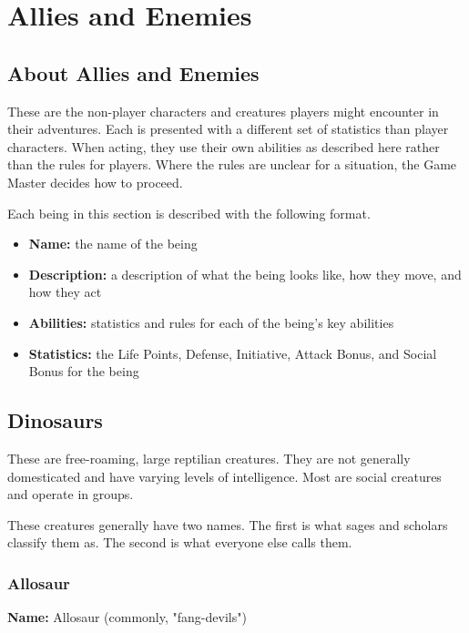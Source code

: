 \chapter{Allies and Enemies}

\begin{multicols}{2}

\section{About Allies and Enemies}

These are the non-player characters and creatures players might encounter in
their adventures. Each is presented with a different set of
statistics than player characters. When acting, they use their
own abilities as described here rather than the rules for players.
Where the rules are unclear for a situation, the Game Master decides
how to proceed.

Each being in this section is described with the following format.

\begin{itemize}
  \item \textbf{Name:} the name of the being
  \item \textbf{Description:} a description of what the being looks like, how they move, and how they act
  \item \textbf{Abilities:} statistics and rules for each of the being's key abilities
  \item \textbf{Statistics:} the Life Points, Defense, Initiative, Attack Bonus, and Social Bonus for the being
\end{itemize}

\section{Dinosaurs}

These are free-roaming, large reptilian creatures. They
are not generally domesticated and have varying levels
of intelligence. Most are social creatures and operate in
groups.

These creatures generally have two names. The first is
what sages and scholars classify them as. The second is
what everyone else calls them.

\subsection{Allosaur}

\textbf{Name:} Allosaur (commonly, "fang-devils") 


\end{multicols}
